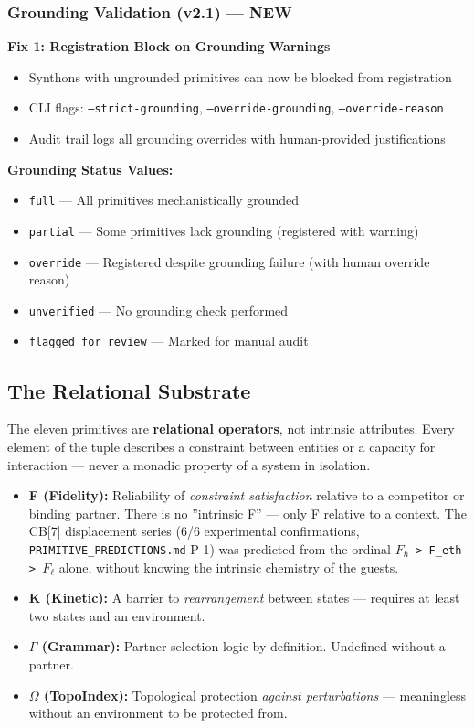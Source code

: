 \documentclass[12pt,a4paper]{article}
\begin{document}
\subsubsection{Grounding Validation (v2.1) --- NEW}

\textbf{Fix 1: Registration Block on Grounding Warnings}

\begin{itemize}
    \item Synthons with ungrounded primitives can now be blocked from registration
    \item CLI flags: \texttt{--strict-grounding}, \texttt{--override-grounding}, \texttt{--override-reason}
    \item Audit trail logs all grounding overrides with human-provided justifications
\end{itemize}

\textbf{Grounding Status Values:}

\begin{itemize}
    \item \texttt{full} --- All primitives mechanistically grounded
    \item \texttt{partial} --- Some primitives lack grounding (registered with warning)
    \item \texttt{override} --- Registered despite grounding failure (with human override reason)
    \item \texttt{unverified} --- No grounding check performed
    \item \texttt{flagged\_for\_review} --- Marked for manual audit
\end{itemize}

\subsection{The Relational Substrate}

The eleven primitives are \textbf{relational operators}, not intrinsic attributes. Every element of the tuple describes a constraint between entities or a capacity for interaction --- never a monadic property of a system in isolation.

\begin{itemize}
    \item \textbf{F (Fidelity):} Reliability of \emph{constraint satisfaction} relative to a competitor or binding partner. There is no ''intrinsic F'' --- only F relative to a context. The CB{[}7{]} displacement series (6/6 experimental confirmations, \texttt{PRIMITIVE\_PREDICTIONS.md} P-1) was predicted from the ordinal \texttt{$F_{\hbar}$ \textgreater{} F\_eth \textgreater{} $F_{\ell}$} alone, without knowing the intrinsic chemistry of the guests.
    \item \textbf{K (Kinetic):} A barrier to \emph{rearrangement} between states --- requires at least two states and an environment.
    \item \textbf{$\Gamma$ (Grammar):} Partner selection logic by definition. Undefined without a partner.
    \item \textbf{$\Omega$ (TopoIndex):} Topological protection \emph{against perturbations} --- meaningless without an environment to be protected from.
\end{itemize}
\end{document}
